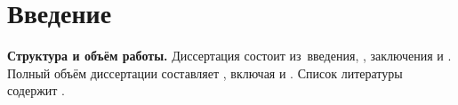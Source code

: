 \chapter*{Введение}

\newcommand{\actuality}{\textbf{Актуальность темы.}\enspace\ignorespaces}
\newcommand{\aim}{\textbf{Цель работы.}\enspace\ignorespaces}
\newcommand{\tasks}{\textbf{Задачи работы.}\enspace\ignorespaces}
\newcommand{\novelty}{\textbf{Научная новизна.}\enspace\ignorespaces}
\newcommand{\influence}{\textbf{Практическая значимость.}\enspace\ignorespaces}
\newcommand{\methods}{\textbf{Методы и инструменты исследования.}\enspace\ignorespaces}
\newcommand{\defpositions}{\textbf{Основные положения, выносимые на защиту.}\enspace\ignorespaces}
\newcommand{\relevance}{\textbf{Соответствие специальность.}\enspace\ignorespaces}
\newcommand{\reliability}{\textbf{Достоверность результатов проведённых исследований.}\enspace\ignorespaces}
\newcommand{\probation}{\textbf{Апробация работы.}\enspace\ignorespaces}
\newcommand{\contribution}{\textbf{Личный вклад автора.}\enspace\ignorespaces}
\newcommand{\publications}{\textbf{Публикации по теме диссертации.}\enspace\ignorespaces}
\newcommand{\structure}{\textbf{Структура и объём работы.}\enspace\ignorespaces}



\structure
Диссертация состоит из~введения,
,
заключения и
.
Полный объём диссертации составляет
, включая
 и
.
Список литературы содержит
.
